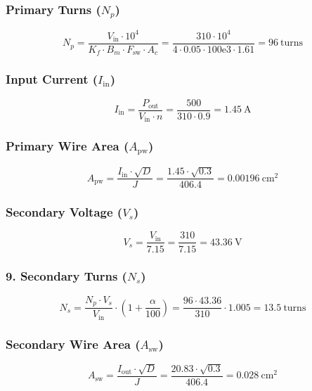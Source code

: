 \subsubsection*{ Primary Turns (\(N_p\))}
\begin{equation}
N_p = \frac{V_{\text{in}} \cdot 10^4}{K_f \cdot B_m \cdot F_{\text{sw}} \cdot A_c} 
= \frac{310 \cdot 10^4}{4 \cdot 0.05 \cdot 100\text{e}3 \cdot 1.61} 
= \boxed{96\ \text{turns}}
\end{equation}

\subsubsection*{ Input Current (\(I_{\text{in}}\))}
\begin{equation}
I_{\text{in}} = \frac{P_{\text{out}}}{V_{\text{in}} \cdot n} 
= \frac{500}{310 \cdot 0.9} 
= \boxed{\SI{1.45}{\ampere}}
\end{equation}

\subsubsection*{ Primary Wire Area (\(A_{\text{pw}}\))}
\begin{equation}
A_{\text{pw}} = \frac{I_{\text{in}} \cdot \sqrt{D}}{J} 
= \frac{1.45 \cdot \sqrt{0.3}}{406.4} 
= \boxed{\SI{0.00196}{\centi\meter\squared}}
\end{equation}

\subsubsection*{ Secondary Voltage (\(V_s\))}
\begin{equation}
V_s = \frac{V_{\text{in}}}{7.15} = \frac{310}{7.15} = \boxed{\SI{43.36}{\volt}}
\end{equation}

\subsubsection*{9. Secondary Turns (\(N_s\))}
\begin{equation}
N_s = \frac{N_p \cdot V_s}{V_{\text{in}}} \cdot \left(1 + \frac{\alpha}{100}\right) 
= \frac{96 \cdot 43.36}{310} \cdot 1.005 
= \boxed{13.5\ \text{turns}}
\end{equation}

\subsubsection*{ Secondary Wire Area (\(A_{\text{sw}}\))}
\begin{equation}
A_{\text{sw}} = \frac{I_{\text{out}} \cdot \sqrt{D}}{J} 
= \frac{20.83 \cdot \sqrt{0.3}}{406.4} 
= \boxed{\SI{0.028}{\centi\meter\squared}}
\end{equation}

